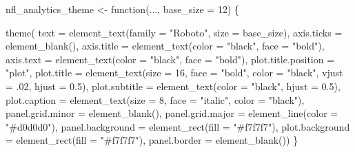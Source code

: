 \documentclass[
  letterpaper,
]{krantz}
\newenvironment{Shaded}{\begin{snugshade}}{\end{snugshade}}
\newcommand{\AttributeTok}[1]{\textcolor[rgb]{0.40,0.45,0.13}{#1}}
\newcommand{\ControlFlowTok}[1]{\textcolor[rgb]{0.00,0.23,0.31}{#1}}
\newcommand{\DecValTok}[1]{\textcolor[rgb]{0.68,0.00,0.00}{#1}}
\newcommand{\FloatTok}[1]{\textcolor[rgb]{0.68,0.00,0.00}{#1}}
\newcommand{\FunctionTok}[1]{\textcolor[rgb]{0.28,0.35,0.67}{#1}}
\newcommand{\NormalTok}[1]{\textcolor[rgb]{0.00,0.23,0.31}{#1}}
\newcommand{\OtherTok}[1]{\textcolor[rgb]{0.00,0.23,0.31}{#1}}
\newcommand{\StringTok}[1]{\textcolor[rgb]{0.13,0.47,0.30}{#1}}
\begin{document}
\begin{Shaded}
\begin{Highlighting}[]
\NormalTok{nfl\_analytics\_theme }\OtherTok{\textless{}{-}} \ControlFlowTok{function}\NormalTok{(..., }\AttributeTok{base\_size =} \DecValTok{12}\NormalTok{) \{}
  
    \FunctionTok{theme}\NormalTok{(}
      \AttributeTok{text =} \FunctionTok{element\_text}\NormalTok{(}\AttributeTok{family =} \StringTok{"Roboto"}\NormalTok{, }\AttributeTok{size =}\NormalTok{ base\_size),}
      \AttributeTok{axis.ticks =} \FunctionTok{element\_blank}\NormalTok{(),}
      \AttributeTok{axis.title =} \FunctionTok{element\_text}\NormalTok{(}\AttributeTok{color =} \StringTok{"black"}\NormalTok{,}
                                \AttributeTok{face =} \StringTok{"bold"}\NormalTok{),}
      \AttributeTok{axis.text =} \FunctionTok{element\_text}\NormalTok{(}\AttributeTok{color =} \StringTok{"black"}\NormalTok{,}
                               \AttributeTok{face =} \StringTok{"bold"}\NormalTok{),}
      \AttributeTok{plot.title.position =} \StringTok{"plot"}\NormalTok{,}
      \AttributeTok{plot.title =} \FunctionTok{element\_text}\NormalTok{(}\AttributeTok{size =} \DecValTok{16}\NormalTok{,}
                                \AttributeTok{face =} \StringTok{"bold"}\NormalTok{,}
                                \AttributeTok{color =} \StringTok{"black"}\NormalTok{,}
                                \AttributeTok{vjust =}\NormalTok{ .}\DecValTok{02}\NormalTok{,}
                                \AttributeTok{hjust =} \FloatTok{0.5}\NormalTok{),}
      \AttributeTok{plot.subtitle =} \FunctionTok{element\_text}\NormalTok{(}\AttributeTok{color =} \StringTok{"black"}\NormalTok{,}
                                   \AttributeTok{hjust =} \FloatTok{0.5}\NormalTok{),}
      \AttributeTok{plot.caption =} \FunctionTok{element\_text}\NormalTok{(}\AttributeTok{size =} \DecValTok{8}\NormalTok{,}
                                  \AttributeTok{face =} \StringTok{"italic"}\NormalTok{,}
                                  \AttributeTok{color =} \StringTok{"black"}\NormalTok{),}
      \AttributeTok{panel.grid.minor =} \FunctionTok{element\_blank}\NormalTok{(),}
      \AttributeTok{panel.grid.major =}  \FunctionTok{element\_line}\NormalTok{(}\AttributeTok{color =} \StringTok{"\#d0d0d0"}\NormalTok{),}
      \AttributeTok{panel.background =} \FunctionTok{element\_rect}\NormalTok{(}\AttributeTok{fill =} \StringTok{"\#f7f7f7"}\NormalTok{),}
      \AttributeTok{plot.background =} \FunctionTok{element\_rect}\NormalTok{(}\AttributeTok{fill =} \StringTok{"\#f7f7f7"}\NormalTok{),}
      \AttributeTok{panel.border =} \FunctionTok{element\_blank}\NormalTok{())}
\NormalTok{\}}
\end{Highlighting}
\end{Shaded}
\end{document}
